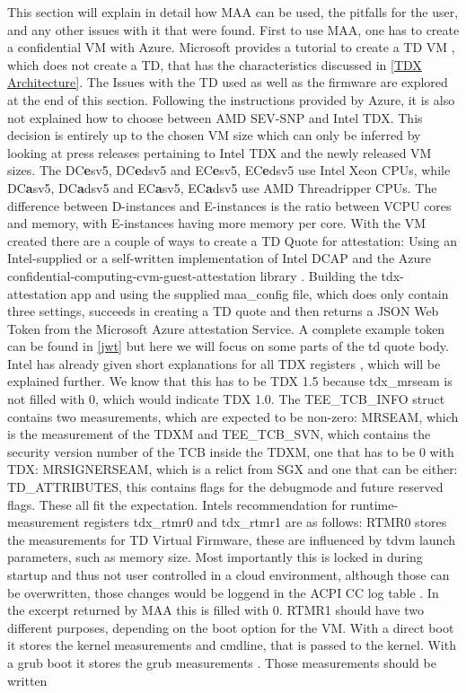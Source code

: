 This section will explain in detail how MAA can be used, the pitfalls for the user, and any other issues with it that were found. First to use MAA, one has to create a confidential VM with Azure. Microsoft provides a tutorial to create a TD VM \cite{chasecrum_github_create_2024}, which does not create a TD, that has the characteristics discussed in \cref{TDX Architecture}. The Issues with the TD used as well as the firmware are explored at the end of this section. Following the instructions provided by Azure, it is also not explained how to choose between AMD SEV-SNP and Intel \Gls{TDX}. This decision is entirely up to the chosen VM size which can only be inferred by looking at press releases pertaining to Intel \Gls{TDX} and the newly released VM sizes. The DC\textbf{e}sv5, DC\textbf{e}dsv5 and EC\textbf{e}sv5, EC\textbf{e}dsv5 use Intel Xeon CPUs, while DC\textbf{a}sv5, DC\textbf{a}dsv5 and EC\textbf{a}sv5, EC\textbf{a}dsv5 use AMD Threadripper CPUs. The difference between D-instances and E-instances is the ratio between VCPU cores and memory, with E-instances having more memory per core. With the VM created there are a couple of ways to create a TD Quote for attestation: Using an Intel-supplied or a self-written implementation of Intel DCAP and the Azure confidential-computing-cvm-guest-attestation library \cite{microsoft_corporation_azureconfidential-computing-cvm-guest-attestation_nodate}. Building the tdx-attestation app and using the supplied maa\_config file, which does only contain three settings, succeeds in creating a TD quote and then returns a JSON Web Token from the Microsoft Azure attestation Service. A complete example token can be found in \cref{jwt} but here we will focus on some parts of the td quote body. Intel has already given short explanations for all \Gls{TDX} registers \cite{intel_corporation_dcap_2024-1}, which will be explained further. We know that this has to be \Gls{TDX} 1.5 because tdx\_mrseam is not filled with 0, which would indicate \Gls{TDX} 1.0. The TEE\_TCB\_INFO struct contains two measurements, which are expected to be non-zero: MRSEAM, which is the measurement of the \Gls{TDXM} and TEE\_TCB\_SVN, which contains the security version number of the TCB inside the \Gls{TDXM}, one that has to be 0 with \Gls{TDX}: MRSIGNERSEAM, which is a relict from \Gls{SGX} and one that can be either: TD\_ATTRIBUTES, this contains flags for the debugmode and future reserved flags. These all fit the expectation. Intels recommendation for runtime-measurement registers tdx\_rtmr0 and tdx\_rtmr1 are as follows: RTMR0 stores the measurements for TD Virtual Firmware, these are influenced by tdvm launch parameters, such as memory size. Most importantly this is locked in during startup and thus not user controlled in a cloud environment, although those can be overwritten, those changes would be loggend in the ACPI CC log table \cite{uefi_forum_inc_acpi_docu_2022}. In the excerpt returned by MAA this is filled with 0. RTMR1 should have two different purposes, depending on the boot option for the VM. With a direct boot it stores the kernel measurements and cmdline, that is passed to the kernel. With a grub boot it stores the grub measurements \cite{intel_corporation_tdx-virtual-firmware-design-guide-rev-004-20231206pdf_2023}. Those measurements should be written 